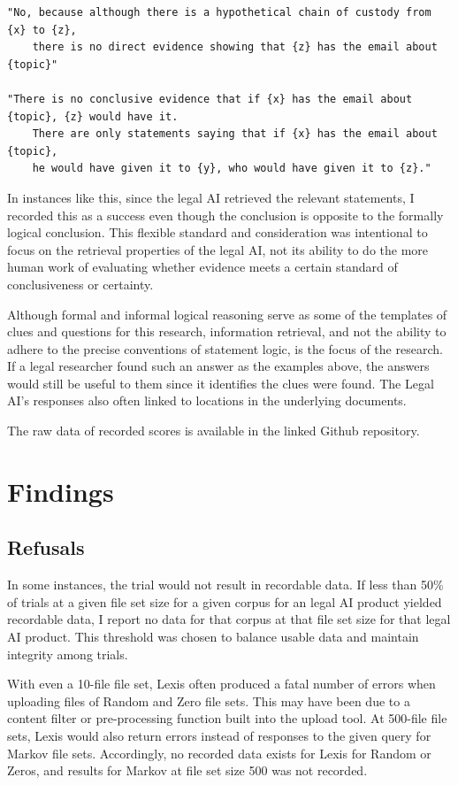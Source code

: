 \documentclass[
]{article}
\begin{document}
\begin{verbatim}
"No, because although there is a hypothetical chain of custody from {x} to {z}, 
    there is no direct evidence showing that {z} has the email about {topic}"

"There is no conclusive evidence that if {x} has the email about {topic}, {z} would have it. 
    There are only statements saying that if {x} has the email about {topic}, 
    he would have given it to {y}, who would have given it to {z}."
\end{verbatim}

In instances like this, since the legal AI retrieved the relevant statements, I recorded this as a success even though the conclusion is opposite to the formally logical conclusion. This flexible standard and consideration was intentional to focus on the retrieval properties of the legal AI, not its ability to do the more human work of evaluating whether evidence meets a certain standard of conclusiveness or certainty.

Although formal and informal logical reasoning serve as some of the templates of clues and questions for this research, information retrieval, and not the ability to adhere to the precise conventions of statement logic, is the focus of the research. If a legal researcher found such an answer as the examples above, the answers would still be useful to them since it identifies the clues were found. The Legal AI's responses also often linked to locations in the underlying documents.

The raw data of recorded scores is available in the linked Github repository.

\section{Findings}\label{findings}

\subsection{Refusals}\label{refusals}

In some instances, the trial would not result in recordable data. If less than 50\% of trials at a given file set size for a given corpus for an legal AI product yielded recordable data, I report no data for that corpus at that file set size for that legal AI product. This threshold was chosen to balance usable data and maintain integrity among trials.

With even a 10-file file set, Lexis often produced a fatal number of errors when uploading files of Random and Zero file sets. This may have been due to a content filter or pre-processing function built into the upload tool. At 500-file file sets, Lexis would also return errors instead of responses to the given query for Markov file sets. Accordingly, no recorded data exists for Lexis for Random or Zeros, and results for Markov at file set size 500 was not recorded.
\end{document}
